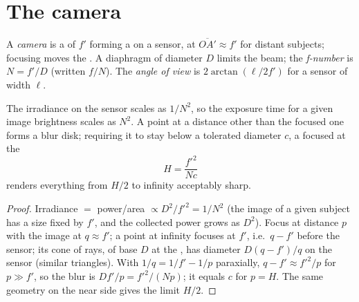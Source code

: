 \section{The camera}

\begin{definition}\label{def:b1:optical-instruments:camera}
A \emph{camera} is a  of  $f'$ forming a  on a sensor, at $\overline{OA'} \approx f'$ for distant subjects;
focusing moves the . A diaphragm of diameter $D$ limits the beam;
the \emph{f-number} is $N = f'/D$ (written $f/N$). The \emph{angle of
view} is $2\arctan(\ell/2f')$ for a sensor of width $\ell$.
\end{definition}

\begin{proposition}\label{prop:b1:optical-instruments:dof}
The irradiance on the sensor scales as $1/N^2$, so the exposure time
for a given image brightness scales as $N^2$. A point at a distance
other than the focused one forms a blur disk; requiring it to stay
below a tolerated diameter $c$, a  focused at the \emph{}
\[
H = \frac{f'^2}{N c}
\]
renders everything from $H/2$ to infinity acceptably sharp.
\end{proposition}

\begin{proof}
Irradiance $=$ power/area $\propto D^2/f'^2 = 1/N^2$ (the image of a
given subject has a size fixed by $f'$, and the collected power grows
as $D^2$). Focus at distance $p$ with the image at $q \approx f'$;
a point at infinity focuses at $f'$, i.e.\ $q - f'$ before the sensor;
its cone of rays, of base $D$ at the , has diameter $D(q - f')/q$
on the sensor (similar triangles). With $1/q = 1/f' - 1/p$ paraxially,
$q - f' \approx f'^2/p$ for $p \gg f'$, so the blur is
$Df'/p = f'^2/(Np)$; it equals $c$ for $p = H$. The same geometry on the
near side gives the limit $H/2$.
\end{proof}

